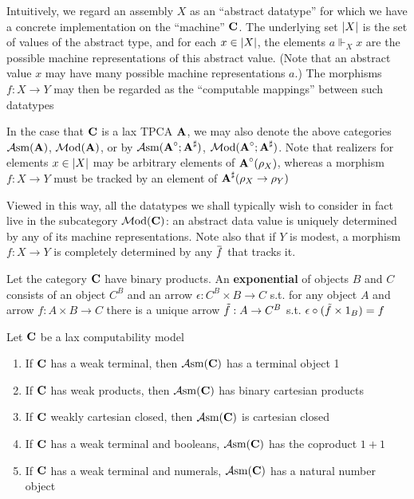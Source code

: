\documentclass[11pt]{article}
\DeclareMathOperator{\Asm}{\mathcal{A}sm}
\DeclareMathOperator{\nMod}{\mathcal{M}od}
\begin{document}
Intuitively, we regard an assembly \(X\) as an ``abstract datatype'' for which we have a concrete
implementation on the ``machine'' \(\operatorname{\textbf{C}}\). The underlying set \(\abs{X}\) is the set of values of
the abstract type, and for each \(x\in\abs{X}\), the elements \(a\Vdash_Xx\) are the possible
machine representations of this abstract value. (Note that an abstract value \(x\) may have many
possible machine representations \(a\).) The morphisms \(f:X\to Y\) may then be regarded as the
``computable mappings'' between such datatypes

In the case that \(\operatorname{\textbf{C}}\) is a lax TPCA \(\operatorname{\textbf{A}}\), we may also denote the above
categories \(\Asm(\bA)\), \(\nMod(\bA)\), or by \(\Asm(\bA^\circ;\bA^\sharp)\), \(\nMod(\bA^\circ;\bA^\sharp)\). Note that
realizers for elements \(x\in\abs{X}\) may be arbitrary elements of \(\operatorname{\textbf{A}}^\circ(\rho_X)\), whereas a
morphism \(f:X\to Y\) must be tracked by an element of \(\operatorname{\textbf{A}}^\sharp(\rho_X\to\rho_Y)\)

Viewed in this way, all the datatypes we shall typically wish to consider in fact live in the
subcategory \(\nMod(\bC)\): an abstract data value is uniquely determined by any of its machine
representations. Note also that if \(Y\) is modest, a morphism \(f:X\to Y\) is completely determined by
any \(\barf\) that tracks it.

\begin{definition}[]
Let the category \(\operatorname{\textbf{C}}\) have binary products. An \textbf{exponential} of objects \(B\) and \(C\) consists
of an object \(C^B\) and an arrow \(\epsilon:C^B\times B\to C\) s.t. for any object \(A\) and
arrow \(f:A\times B\to C\) there is a unique arrow \(\tilde{f}:A\to C^B\) s.t. \(\epsilon\circ(\tilde{f}\times 1_B)=f\)
\begin{center}\hspace{1cm}\end{center}
\end{definition}


\begin{theorem}[]
\label{3.3.22}
Let \(\operatorname{\textbf{C}}\) be a lax computability model
\begin{enumerate}
\item If \(\operatorname{\textbf{C}}\) has a weak terminal, then \(\Asm(\bC)\) has a terminal object 1
\item If \(\operatorname{\textbf{C}}\) has weak products, then \(\Asm(\bC)\) has binary cartesian products
\item If \(\operatorname{\textbf{C}}\) weakly cartesian closed, then \(\Asm(\bC)\) is cartesian closed
\item If \(\operatorname{\textbf{C}}\) has a weak terminal and booleans, \(\Asm(\bC)\) has the coproduct \(1+1\)
\item If \(\operatorname{\textbf{C}}\) has a weak terminal and numerals, \(\Asm(\bC)\) has a natural number object
\end{enumerate}
\end{theorem}
\end{document}
